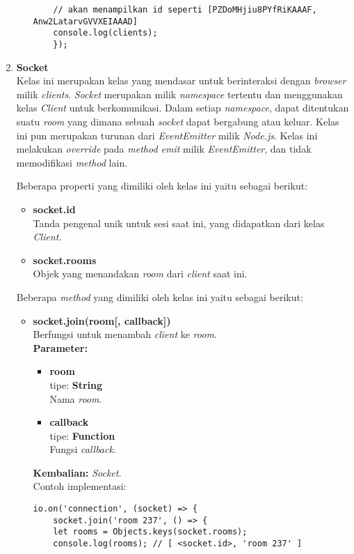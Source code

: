 \begin{enumerate}
\begin{itemize}
\begin{lstlisting}
	// akan menampilkan id seperti [PZDoMHjiu8PYfRiKAAAF, Anw2LatarvGVVXEIAAAD]
	console.log(clients); 
	});
	\end{lstlisting}
	\end{itemize}
	
	\item \textbf{Socket} \\
	Kelas ini merupakan kelas yang mendasar untuk berinteraksi dengan \textit{browser} milik \textit{clients}. \textit{Socket} merupakan milik \textit{namespace} tertentu dan menggunakan kelas \textit{Client} untuk berkomunikasi. Dalam setiap \textit{namespace}, dapat ditentukan suatu \textit{room} yang dimana sebuah \textit{socket} dapat bergabung atau keluar. Kelas ini pun merupakan turunan dari \textit{EventEmitter} milik \textit{Node.js}. Kelas ini melakukan \textit{override} pada \textit{method emit} milik \textit{EventEmitter}, dan tidak memodifikasi \textit{method} lain.
	
	Beberapa properti yang dimiliki oleh kelas ini yaitu sebagai berikut:
	\begin{itemize}
		\item \textbf{socket.id} \\ Tanda pengenal unik untuk sesi saat ini, yang didapatkan dari kelas \textit{Client}.
		\item \textbf{socket.rooms} \\ Objek yang menandakan \textit{room} dari \textit{client} saat ini.
	\end{itemize}

	Beberapa \textit{method} yang dimiliki oleh kelas ini yaitu sebagai berikut:
	\begin{itemize}
		\item \textbf{socket.join(room[, callback])} \\
		Berfungsi untuk menambah \textit{client} ke \textit{room}. \\
		\textbf{Parameter:}
		\begin{itemize}
			\item \textbf{room} \\tipe: \textbf{String} \\ Nama \textit{room}.
			\item \textbf{callback} \\tipe: \textbf{Function} \\ Fungsi \textit{callback}.
		\end{itemize}
		\textbf{Kembalian:} \textit{Socket}. \\
		Contoh implementasi:
	\begin{lstlisting}
io.on('connection', (socket) => {
	socket.join('room 237', () => {
	let rooms = Objects.keys(socket.rooms);
	console.log(rooms); // [ <socket.id>, 'room 237' ]
		

\end{lstlisting}
\end{itemize}
\end{enumerate}
